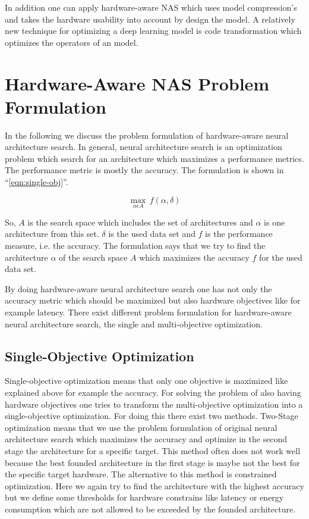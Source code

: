 \documentclass[conference]{IEEEtran}
\begin{document}
In addition one can apply hardware-aware NAS which uses model compression's and takes the hardware usability into account by design the model. A relatively new technique for optimizing a deep learning model is code transformation which optimizes the operators of an model.

\section{Hardware-Aware NAS Problem Formulation}
\label{section:ProblemFormulation}
In the following we discuss the problem formulation of hardware-aware neural architecture search. In general, neural architecture search is an optimization problem which search for an architecture which maximizes a performance metrics. The performance metric is mostly the accuracy. The formulation is shown in ``\eqref{eqn:single-obj}''. 
 
\begin{equation}
\label{eqn:single-obj}
\max_{\alpha\epsilon A}\,f(\alpha, \delta)
\end{equation}

So, $A$ is the search space which includes the set of architectures and $\alpha$ is one architecture from this set. $\delta$ is the used data set and $f$ is the performance measure, i.e. the accuracy.  The formulation says that we try to find the architecture $\alpha$ of the search space $A$ which maximizes the accuracy $f$ for the used data set. 
 
By doing hardware-aware neural architecture search one has not only the accuracy metric which should be maximized but also hardware objectives like for example latency. There exist different problem formulation for hardware-aware neural architecture search, the single and multi-objective optimization.

\subsection{Single-Objective Optimization}

Single-objective optimization means that only one objective is maximized like explained above for example the accuracy. For solving the problem of also having hardware objectives one tries to transform the multi-objective optimization into a single-objective optimization. For doing this there exist two methods. Two-Stage optimization means that we use the problem formulation of original neural architecture search which maximizes the accuracy and optimize in the second stage the architecture for a specific target. This method often does not work well because the best founded architecture in the first stage is maybe not the best for the specific target hardware. The alternative to this method is constrained optimization. Here we again try to find the architecture with the highest accuracy but we define some thresholds for hardware constrains like latency or energy consumption which are not allowed to be exceeded by the founded architecture. 
\end{document}
